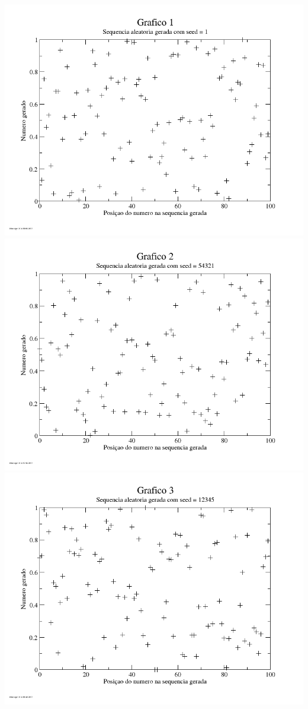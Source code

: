 \documentclass{article}
\begin{document}
\includegraphics[width=\textwidth]{graf1}
\includegraphics[width=\textwidth]{graf2}
\includegraphics[width=\textwidth]{graf3}
\end{document}
